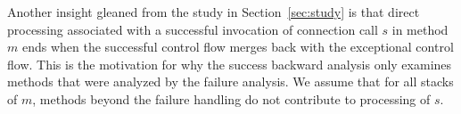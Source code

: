 Another insight gleaned from the study in Section~\ref{sec:study} is
that direct processing associated with a successful invocation of
connection call $s$ in method $m$ ends when the successful control
flow merges back with the exceptional control flow. This is the
motivation for why the success backward analysis only examines methods
that were analyzed by the failure analysis.  We assume that for all
stacks of $m$, methods beyond the failure handling do not contribute
to processing of $s$.

